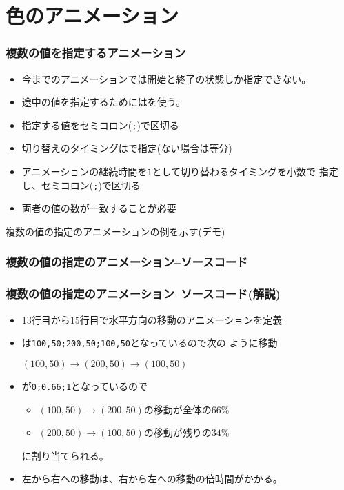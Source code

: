 

\frame{\maketitle}
\section{色のアニメーション}
\begin{frame}[containsverbatim]
 \frametitle{複数の値を指定するアニメーション}
\begin{itemize}
 \item  今までのアニメーションでは開始と終了の状態しか指定できない。
 \item  途中の値を指定するためにはを使う。
 \item 指定する値をセミコロン(\texttt{;})で区切る
 \item 切り替えのタイミングはで指定(ない場合は等分)
 \item アニメーションの継続時間を\texttt{1}として切り替わるタイミングを小数で
			 指定し、セミコロン(\texttt{;})で区切る
 \item 両者の値の数が一致することが必要
\end{itemize}
 複数の値の指定のアニメーションの例を示す(デモ)
\end{frame}
\begin{frame}[containsverbatim]
 \frametitle{複数の値の指定のアニメーション--ソースコード}
\end{frame}
\begin{frame}[containsverbatim]
 \frametitle{複数の値の指定のアニメーション--ソースコード(解説)}
 \begin{itemize}
	\item 13行目から15行目で水平方向の移動のアニメーションを定義
  \item {}は\texttt{100,50;200,50;100,50}となっているので次の
        ように移動
        \begin{center}
         $(100,50)\rightarrow(200,50)\rightarrow(100,50)$
        \end{center}
  \item {}が\texttt{0;0.66;1}となっているので
        \begin{itemize}
         \item $(100,50)\rightarrow(200,50)$の移動が全体の$66\%$
         \item $(200,50)\rightarrow(100,50)$の移動が残りの$34\%$
        \end{itemize}
        に割り当てられる。
  \item 左から右への移動は、右から左への移動の倍時間がかかる。
 \end{itemize}
\end{frame}
